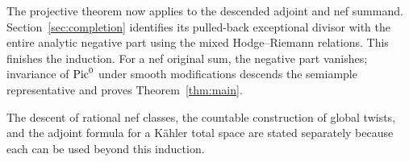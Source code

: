 The projective theorem now applies to the descended adjoint and nef
summand. Section~\ref{sec:completion} identifies its pulled-back
exceptional divisor with the entire analytic negative part using
the mixed Hodge--Riemann relations. This finishes the induction.
For a nef original sum, the negative part vanishes; invariance of
\(\operatorname{Pic}^0\) under smooth modifications descends the semiample
representative and proves Theorem~\ref{thm:main}.

The descent of rational nef classes, the countable construction of
global twists, and the adjoint formula for a K\"ahler total space
are stated separately because each can be used beyond this induction.
